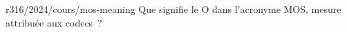 \begin{question}{r316/2024/cours/mos-meaning}
  Que signifie le O dans l'acronyme MOS, mesure attribuée aux codecs~?
  \begin{reponses}
  \end{reponses}
\end{question}

